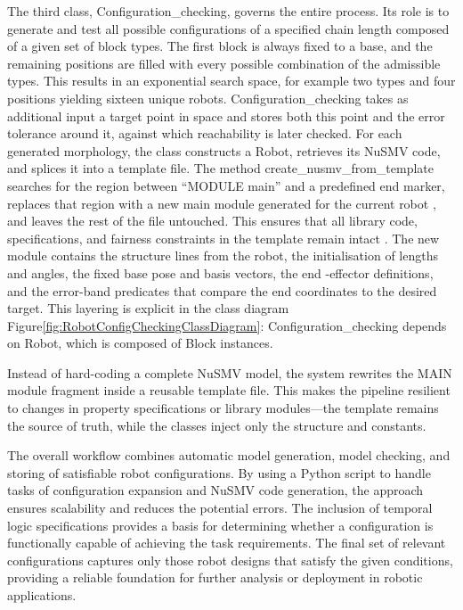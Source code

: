 The third class, Configuration\_checking, governs the entire process. 
Its role is to generate and test all possible configurations of a 
specified chain length composed of a given set of block types. The first 
block is always fixed to a base, and the remaining positions are filled 
with every possible combination of the admissible types. This results in 
an exponential search space, for example two types and four positions yielding 
sixteen unique robots. Configuration\_checking takes as additional input 
a target point in space and stores both this point and the error tolerance 
around it, against which reachability is later checked. For each generated 
morphology, the class constructs a Robot, retrieves its NuSMV code, 
and splices it into a template file. The method create\_nusmv\_from\_template searches 
for the region between “MODULE main” and a predefined end marker, 
replaces that region with a new main module generated for the current robot
, and leaves the rest of the file untouched. This ensures that all library 
code, specifications, and fairness constraints in the template remain intact
. The new module contains the structure lines from the robot, the initialisation 
of lengths and angles, the fixed base pose and basis vectors, the end
-effector definitions, and the error-band predicates that compare the 
end coordinates to the desired target.
 This layering is explicit in the class diagram Figure\ref{fig:RobotConfigCheckingClassDiagram}: 
Configuration\_checking depends on Robot, which is composed of Block instances.

Instead of hard-coding a complete NuSMV 
model, the system rewrites  the MAIN module fragment inside a 
reusable template file. This makes the pipeline resilient to changes in 
property specifications or library modules—the template remains the 
source of truth, while the classes inject only the structure and constants.


The overall workflow combines automatic model generation, model checking,
and storing of satisfiable robot configurations. 
By using a Python script to handle tasks 
of configuration expansion and NuSMV code generation, the approach ensures 
scalability and reduces the potential errors. The inclusion of 
temporal logic specifications provides a basis for determining whether 
a configuration is functionally capable of achieving the task requirements. 
The final set of relevant configurations captures only those robot 
designs that satisfy the given conditions, providing a reliable foundation 
for further analysis or deployment in robotic applications.


